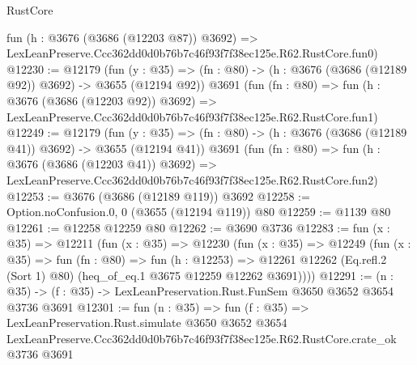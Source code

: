 \begin{lexlean}{RustCore}
\begin{coremodule}
    fun (h : @3676 (@3686 (@12203 @87)) @3692) =>
    LexLeanPreserve.Ccc362dd0d0b76b7c46f93f7f38ec125e.R62.RustCore.fun0)
@12230 := @12179
    (fun (y : @35) => (fn : @80) -> (h : @3676 (@3686 (@12189 @92)) @3692) -> @3655 (@12194 @92))
    @3691
    (fun (fn : @80) =>
    fun (h : @3676 (@3686 (@12203 @92)) @3692) =>
    LexLeanPreserve.Ccc362dd0d0b76b7c46f93f7f38ec125e.R62.RustCore.fun1)
@12249 := @12179
    (fun (y : @35) => (fn : @80) -> (h : @3676 (@3686 (@12189 @41)) @3692) -> @3655 (@12194 @41))
    @3691
    (fun (fn : @80) =>
    fun (h : @3676 (@3686 (@12203 @41)) @3692) =>
    LexLeanPreserve.Ccc362dd0d0b76b7c46f93f7f38ec125e.R62.RustCore.fun2)
@12253 := @3676 (@3686 (@12189 @119)) @3692
@12258 := Option.noConfusion.{0, 0} (@3655 (@12194 @119)) @80
@12259 := @1139 @80
@12261 := @12258 @12259 @80
@12262 := @3690 @3736
@12283 := fun (x : @35) =>
  @12211
    (fun (x : @35) =>
    @12230
      (fun (x : @35) =>
      @12249
        (fun (x : @35) =>
        fun (fn : @80) =>
        fun (h : @12253) =>
        @12261 @12262 (Eq.refl.{2} (Sort 1) @80) (heq_of_eq.{1} @3675 @12259 @12262 @3691))))
@12291 := (n : @35) -> (f : @35) -> LexLeanPreservation.Rust.FunSem @3650 @3652 @3654 @3736 @3691
@12301 := fun (n : @35) =>
  fun (f : @35) =>
  LexLeanPreservation.Rust.simulate
    @3650
    @3652
    @3654
    LexLeanPreserve.Ccc362dd0d0b76b7c46f93f7f38ec125e.R62.RustCore.crate_ok
    @3736
    @3691
\end{coremodule}
\end{lexlean}

